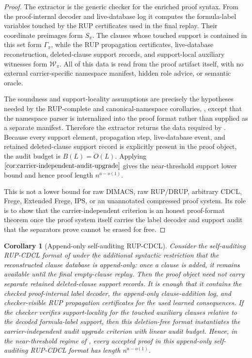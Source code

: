 \documentclass[11pt]{article}
\newtheorem{corollary}[theorem]{Corollary}
\theoremstyle{definition}
\begin{document}
\begin{proof}
The extractor is the generic checker for the enriched proof syntax.  From the
proof-internal decoder and live-database log it computes the formula-label
variables touched by the RUP certificates used in the final replay.  Their
coordinate preimages form \(S_\pi\).  The clauses whose touched support is
contained in this set form \(\Gamma_\pi\), while the RUP propagation
certificates, live-database reconstruction, deleted-clause support records, and
support-local auxiliary witnesses form \(\mathcal W_\pi\).  All of this data is
read from the proof artifact itself, with no external carrier-specific
namespace manifest, hidden role advice, or semantic oracle.

The soundness and support-locality assumptions are precisely the hypotheses
needed by the RUP-complete and canonical-namespace corollaries,
, except that the
namespace parser is internalized into the proof format rather than supplied as a
separate manifest.  Therefore the extractor returns the data required by
.  Because every
support element, propagation step, live-database event, and retained
deleted-clause support record is explicitly present in the proof object, the
audit budget is \(B(L)=O(L)\).  Applying
\(\Cref{cor:carrier-independent-audit-upgrade}\) gives the near-threshold
support lower bound and hence proof length \(n^{a-o(1)}\).

This is not a lower bound for raw DIMACS, raw RUP/DRUP, arbitrary CDCL, Frege,
Extended Frege, IPS, or an unannotated compressed proof system.  Its role is to
show that the carrier-independent criterion is an honest proof-format theorem
once the proof system itself carries the label decoder and support audit that
the separators prove cannot be erased for free.
\end{proof}

\begin{corollary}[Append-only self-auditing RUP-CDCL]\label{cor:append-only-self-auditing-rup-cdcl}
Consider the self-auditing RUP-CDCL format of
 under the additional syntactic restriction
that the reconstructed clause database is append-only: once a clause is added,
it remains available until the final empty-clause replay.  Then the proof object
need not carry separate retained deleted-clause support records.  It is enough
that it contains the checked proof-internal label decoder, the append-only clause-addition log, and checker-visible RUP propagation certificates for the
used learned consequences.  If the checker verifies support-locality for the
touched auxiliary clauses relative to the decoded formula-label support, then
this deletion-free format instantiates the carrier-independent audit upgrade
criterion with linear audit budget.  Hence, in the near-threshold regime of
, every accepted proof in this append-only
self-auditing RUP-CDCL format has length \(n^{a-o(1)}\).
\end{corollary}
\end{document}
